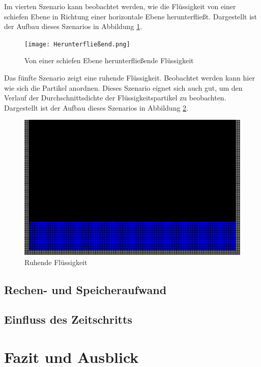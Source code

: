 \documentclass{scrreprt}
\begin{document}
Im vierten Szenario kann beobachtet werden, wie die Flüssigkeit von einer schiefen Ebene in Richtung einer horizontale Ebene herunterfließt.
Dargestellt ist der Aufbau dieses Szenarios in Abbildung \ref{image:flowing_fluid}.
\begin{figure}[htb]
    \texttt{[image: Herunterfließend.png]}
    \caption{Von einer schiefen Ebene herunterfließende Flüssigkeit}
    \label{image:flowing_fluid}
\end{figure}

Das fünfte Szenario zeigt eine ruhende Flüssigkeit.
Beobachtet werden kann hier wie sich die Partikel anordnen.
Dieses Szenario eignet sich auch gut, um den Verlauf der Durchschnittsdichte der Flüssigkeitspartikel zu beobachten.
Dargestellt ist der Aufbau dieses Szenarios in Abbildung \ref{image:resting_fluid}.
\begin{figure}[htb]
    \includegraphics[width=\textwidth]{Ruhend.png}
    \caption{Ruhende Flüssigkeit}
    \label{image:resting_fluid}
\end{figure}


\section{Rechen- und Speicheraufwand}
\section{Einfluss des Zeitschritts}
\chapter{Fazit und Ausblick}


\end{document}
